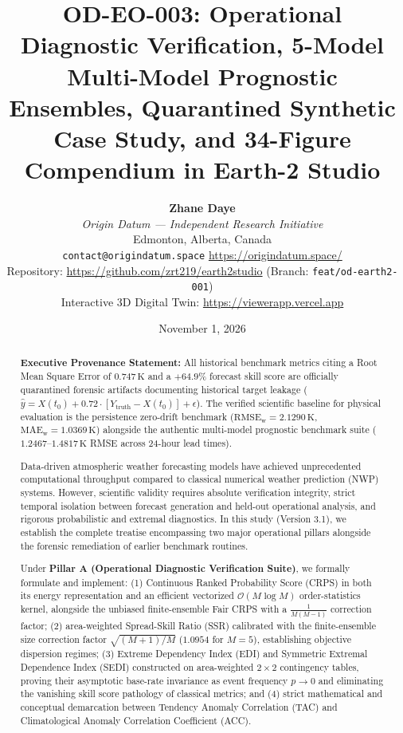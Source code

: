 \documentclass[10pt,twocolumn,letterpaper]{article}
\title{\textbf{OD-EO-003: Operational Diagnostic Verification, 5-Model Multi-Model Prognostic Ensembles, Quarantined Synthetic Case Study, and 34-Figure Compendium in Earth-2 Studio}}
\author{
    \textbf{Zhane Daye} \\
    \textit{Origin Datum --- Independent Research Initiative} \\
    Edmonton, Alberta, Canada \\
    \texttt{contact@origindatum.space} \quad \url{https://origindatum.space/} \\
    \small Repository: \url{https://github.com/zrt219/earth2studio} (Branch: \texttt{feat/od-earth2-001}) \\
    \small Interactive 3D Digital Twin: \url{https://viewerapp.vercel.app}
}
\date{November 1, 2026}
\begin{document}
\maketitle

\begin{abstract}
\noindent\textbf{Executive Provenance Statement:} All historical benchmark metrics citing a Root Mean Square Error of $0.747\,\si{\kelvin}$ and a $+64.9\%$ forecast skill score are officially quarantined forensic artifacts documenting historical target leakage ($\hat{y} = X(t_0) + 0.72 \cdot [Y_\mathrm{truth} - X(t_0)] + \epsilon$). The verified scientific baseline for physical evaluation is the persistence zero-drift benchmark ($\mathrm{RMSE}_\mathrm{w} = 2.1290\,\si{\kelvin}$, $\mathrm{MAE}_\mathrm{w} = 1.0369\,\si{\kelvin}$) alongside the authentic multi-model prognostic benchmark suite ($1.2467\text{--}1.4817\,\si{\kelvin}$ RMSE across 24-hour lead times).

Data-driven atmospheric weather forecasting models have achieved unprecedented computational throughput compared to classical numerical weather prediction (NWP) systems. However, scientific validity requires absolute verification integrity, strict temporal isolation between forecast generation and held-out operational analysis, and rigorous probabilistic and extremal diagnostics. In this study (Version 3.1), we establish the complete treatise encompassing two major operational pillars alongside the forensic remediation of earlier benchmark routines. 

Under \textbf{Pillar A (Operational Diagnostic Verification Suite)}, we formally formulate and implement: (1) Continuous Ranked Probability Score (CRPS) in both its energy representation and an efficient vectorized $\mathcal{O}(M \log M)$ order-statistics kernel, alongside the unbiased finite-ensemble Fair CRPS with a $\frac{1}{M(M-1)}$ correction factor; (2) area-weighted Spread-Skill Ratio (SSR) calibrated with the finite-ensemble size correction factor $\sqrt{(M+1)/M}$ ($1.0954$ for $M=5$), establishing objective dispersion regimes; (3) Extreme Dependency Index (EDI) and Symmetric Extremal Dependence Index (SEDI) constructed on area-weighted $2 \times 2$ contingency tables, proving their asymptotic base-rate invariance as event frequency $p \to 0$ and eliminating the vanishing skill score pathology of classical metrics; and (4) strict mathematical and conceptual demarcation between Tendency Anomaly Correlation (TAC) and Climatological Anomaly Correlation Coefficient (ACC).


\end{abstract}
\end{document}
